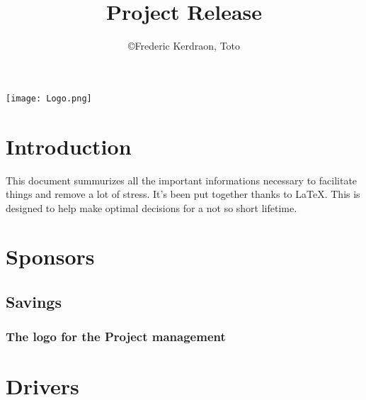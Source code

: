\documentclass[8pt]{article} %
\title{Project Release}
\author{\copyright Frederic Kerdraon, Toto}
\begin{document}
\maketitle
\hspace*{-1cm}\texttt{[image: Logo.png]}
\tableofcontents

\section{Introduction}

This document summurizes all the important informations necessary to facilitate things and remove a lot of stress. It's been put together thanks to \LaTeX. This is designed to help make optimal decisions for a not so short lifetime.

%


\newcommand{\slice}[4]{
  \pgfmathparse{0.5*#1+0.5*#2}
  \let\midangle\pgfmathresult

   slice
  \draw[thick,fill=black!10] (0,0) -- (#1:1) arc (#1:#2:1) -- cycle;

   outer label
  \node[label=\midangle:#4] at (\midangle:1) {};

   inner label
  \pgfmathparse{min((#2-#1-10)/110*(-0.3),0)}
  \let\temp\pgfmathresult
  \pgfmathparse{max(\temp,-0.5) + 0.8}
  \let\innerpos\pgfmathresult
  \node at (\midangle:\innerpos) {#3};
}

\section{Sponsors}

\subsection{Savings}
\subsubsection{The logo for the Project management}


\section{Drivers}
\end{document}
